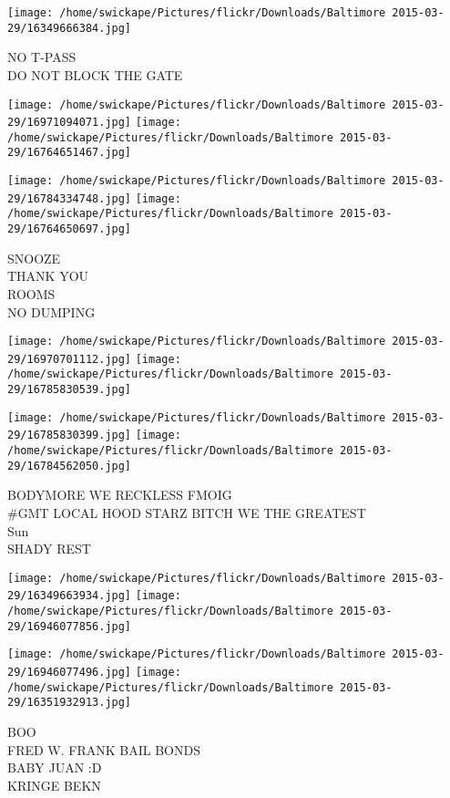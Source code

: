 \documentclass[10pt,letterpaper]{article}
\begin{document}
\vspace{0.25in}
\texttt{[image: /home/swickape/Pictures/flickr/Downloads/Baltimore 2015-03-29/16349666384.jpg]}

NO T{-}PASS\\
DO NOT BLOCK THE GATE\\
\pagebreak

\texttt{[image: /home/swickape/Pictures/flickr/Downloads/Baltimore 2015-03-29/16971094071.jpg]}
\texttt{[image: /home/swickape/Pictures/flickr/Downloads/Baltimore 2015-03-29/16764651467.jpg]}

\texttt{[image: /home/swickape/Pictures/flickr/Downloads/Baltimore 2015-03-29/16784334748.jpg]}
\texttt{[image: /home/swickape/Pictures/flickr/Downloads/Baltimore 2015-03-29/16764650697.jpg]}

SNOOZE\\
THANK YOU\\
ROOMS\\
NO DUMPING\\
\pagebreak

\texttt{[image: /home/swickape/Pictures/flickr/Downloads/Baltimore 2015-03-29/16970701112.jpg]}
\texttt{[image: /home/swickape/Pictures/flickr/Downloads/Baltimore 2015-03-29/16785830539.jpg]}

\texttt{[image: /home/swickape/Pictures/flickr/Downloads/Baltimore 2015-03-29/16785830399.jpg]}
\texttt{[image: /home/swickape/Pictures/flickr/Downloads/Baltimore 2015-03-29/16784562050.jpg]}

BODYMORE WE RECKLESS FMOIG\\
\#GMT LOCAL HOOD STARZ BITCH WE THE GREATEST\\
Sun\\
SHADY REST\\
\pagebreak

\texttt{[image: /home/swickape/Pictures/flickr/Downloads/Baltimore 2015-03-29/16349663934.jpg]}
\texttt{[image: /home/swickape/Pictures/flickr/Downloads/Baltimore 2015-03-29/16946077856.jpg]}

\texttt{[image: /home/swickape/Pictures/flickr/Downloads/Baltimore 2015-03-29/16946077496.jpg]}
\texttt{[image: /home/swickape/Pictures/flickr/Downloads/Baltimore 2015-03-29/16351932913.jpg]}

BOO\\
FRED W. FRANK BAIL BONDS\\
BABY JUAN :D\\
KRINGE BEKN\\
\pagebreak
\end{document}
